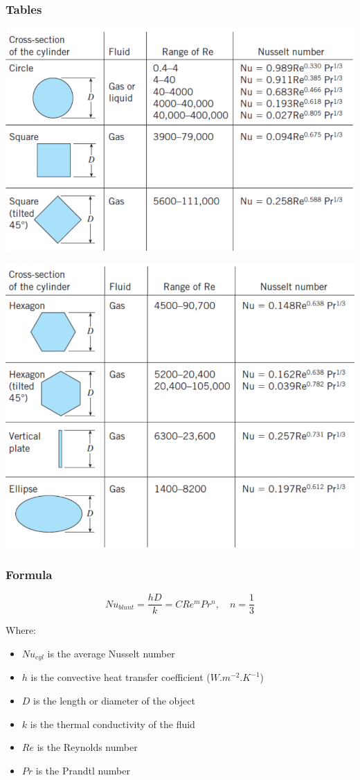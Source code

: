 \documentclass[11pt]{article}
\begin{document}
\subsubsection{Tables}
\label{sec:org5125e54}
\begin{center}
\includegraphics[width=.9\linewidth]{./images/average-nusselt-number-blunt-bodies-page-1.png}
\end{center}
\begin{center}
\includegraphics[width=.9\linewidth]{./images/average-nusselt-number-blunt-bodies-page-2.png}
\end{center}
\subsubsection{Formula}
\label{sec:org04309c5}
\[Nu_{blunt} = \frac{hD}{k} = C Re^m Pr^n, \quad n = \frac{1}{3}\]

Where:
\begin{itemize}
\item \(Nu_{cyl}\) is the average Nusselt number
\item \(h\) is the convective heat transfer coefficient (\(\unit{W.m^{-2}.K^{-1}}\))
\item \(D\) is the length or diameter of the object
\item \(k\) is the thermal conductivity of the fluid
\item \(Re\) is the Reynolds number
\item \(Pr\) is the Prandtl number
\end{itemize}
\end{document}
